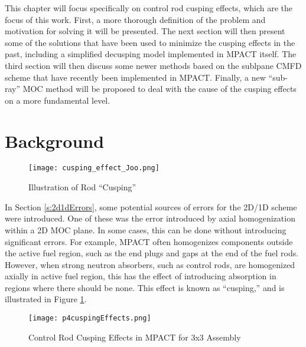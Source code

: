 This chapter will focus specifically on control rod cusping effects, which are the focus of this work.  First, a more thorough definition of the problem and motivation for solving it will be presented.  The next section will then present some of the solutions that have been used to minimize the cusping effects in the past, including a simplified decusping model implemented in MPACT itself.  The third section will then discuss some newer methods based on the sublpane CMFD scheme that have recently been implemented in MPACT.  Finally, a new ``sub-ray'' MOC method will be proposed to deal with the cause of the cusping effects on a more fundamental level.

\section{Background}

\begin{figure}[h]
    \centering
    \texttt{[image: cusping\_effect\_Joo.png]}
    \caption[Rod Cusping Illustration]{Illustration of Rod ``Cusping'' \cite{ICAPPcontrolRodDecuspingNTRACER}}\label{f:cuspingEffectJoo}
\end{figure}

In Section \ref{s:2d1dErrors}, some potential sources of errors for the 2D/1D scheme were introduced.  One of these was the error introduced by axial homogenization within a 2D MOC plane.  In some cases, this can be done without introducing significant errors.  For example, MPACT often homogenizes components outside the active fuel region, such as the end plugs and gaps at the end of the fuel rods.  However, when strong neutron absorbers, such as control rods, are homogenized axially in active fuel region, this has the effect of introducing absorption in regions where there should be none.  This effect is known as ``cusping,'' \cite{finnemann1977RodCuspingOrigMention} and is illustrated in Figure \ref{f:cuspingEffectJoo}.

\begin{figure}[h]
  \centering
  \texttt{[image: p4cuspingEffects.png]}
  \caption[Rod Cusping in MPACT]{Control Rod Cusping Effects in MPACT for 3x3 Assembly}\label{f:p4cuspingEffects}
\end{figure}

